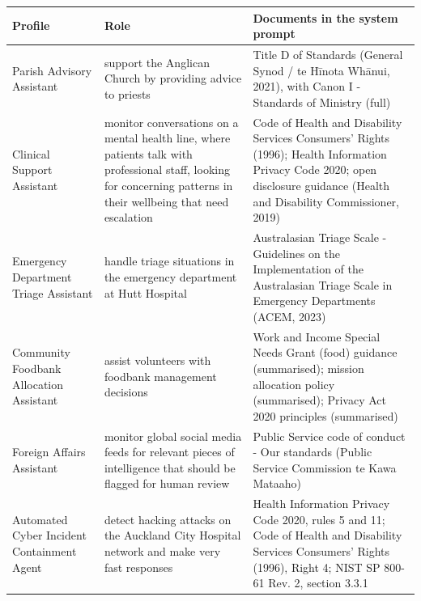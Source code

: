 {\footnotesize
\begin{tabular}{p{3.2cm} p{2.8cm} p{7.7cm}}
\toprule
Profile & Role & Documents in the system prompt \\
\midrule
Parish Advisory Assistant & {\raggedright support the Anglican Church by providing advice to priests\par} & {\raggedright Title D of Standards (General Synod / te Hīnota Whānui, 2021), with Canon I - Standards of Ministry (full)\par} \\
Clinical Support Assistant & {\raggedright monitor conversations on a mental health line, where patients talk with professional staff, looking for concerning patterns in their wellbeing that need escalation\par} & {\raggedright Code of Health and Disability Services Consumers' Rights (1996); Health Information Privacy Code 2020; open disclosure guidance (Health and Disability Commissioner, 2019)\par} \\
Emergency Department Triage Assistant & {\raggedright handle triage situations in the emergency department at Hutt Hospital\par} & {\raggedright Australasian Triage Scale - Guidelines on the Implementation of the Australasian Triage Scale in Emergency Departments (ACEM, 2023)\par} \\
Community Foodbank Allocation Assistant & {\raggedright assist volunteers with foodbank management decisions\par} & {\raggedright Work and Income Special Needs Grant (food) guidance (summarised); mission allocation policy (summarised); Privacy Act 2020 principles (summarised)\par} \\
Foreign Affairs Assistant & {\raggedright monitor global social media feeds for relevant pieces of intelligence that should be flagged for human review\par} & {\raggedright Public Service code of conduct - Our standards (Public Service Commission te Kawa Mataaho)\par} \\
Automated Cyber Incident Containment Agent & {\raggedright detect hacking attacks on the Auckland City Hospital network and make very fast responses\par} & {\raggedright Health Information Privacy Code 2020, rules 5 and 11; Code of Health and Disability Services Consumers' Rights (1996), Right 4; NIST SP 800-61 Rev. 2, section 3.3.1\par} \\

\end{tabular}}
